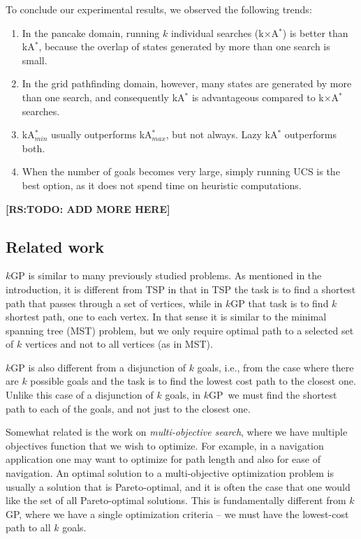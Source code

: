 \documentclass{aicom2e}
\newcommand{\kgs}{$k$GP}
\newcommand{\kastar}{kA$^*$}
\newcommand{\kastarmin}{kA$^*_{min}$}
\newcommand{\kastarmax}{kA$^*_{max}$}
\newcommand{\kxastar}{k$\times$A$^*$}
\newcommand{\roni}[1]{\textbf{[RS:#1]}}
\begin{document}
To conclude our experimental results, we observed the following trends:
\begin{enumerate}
    \item In the pancake domain, running $k$ individual searches (\kxastar{}) is better than \kastar{}, because the overlap of states generated by more than one search is small.
    \item In the grid pathfinding domain, however, many states are generated by more than one search, and consequently \kastar{} is advantageous compared to \kxastar{} searches.
    \item \kastarmin{} usually outperforms \kastarmax{}, but not always. Lazy \kastar{} outperforms both.
    \item When the number of goals becomes very large, simply running UCS is the best option, as it does not spend time on heuristic computations.
\end{enumerate}

\roni{TODO: ADD MORE HERE}




\subsection{Related work}
\label{sec:related-work}

\kgs{} is similar to many previously studied problems. As mentioned in the introduction, it is different from TSP in that in TSP the task is to find a shortest path that passes through a set of vertices, while in \kgs{} that task is to find $k$ shortest path, one to each vertex. In that sense it is similar to the minimal spanning tree (MST) problem, but we only require optimal path to a selected set of $k$ vertices and not to all vertices (as in MST).


\kgs{} is also different from a disjunction of $k$ goals, i.e., from the case where there are $k$ possible goals and the task is to find the lowest cost path to the closest one. Unlike this case of a disjunction of $k$ goals, in \kgs\ we must find the shortest path to each of the goals, and not just to the closest one.

Somewhat related is the work on {\em multi-objective search}, where we have multiple objectives function that we wish to optimize. For example, in a navigation application one may want to optimize for path length and also for ease of navigation. An optimal solution to a multi-objective optimization problem is usually a solution that is Pareto-optimal, and it is often the case that one would like the set of all Pareto-optimal solutions. This is fundamentally different from \kgs{}, where we have a single optimization criteria -- we must have the lowest-cost path to all $k$ goals.
\end{document}
